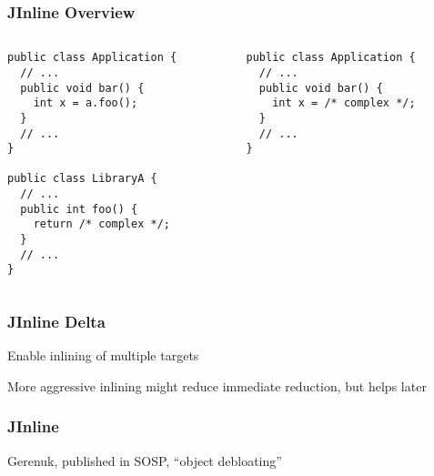 \documentclass[aspectratio=169]{beamer}
\begin{document}
  \begin{frame}[fragile]
    \frametitle{JInline Overview}
    \begin{columns}[t]
      \begin{column}{0.5\textwidth}
        \hspace{3.4em} 
        \begin{lstlisting}[xleftmargin=4em]
public class Application {
  // ...
  public void bar() {
    int x = a.foo();
  }
  // ...
}

public class LibraryA {
  // ...
  public int foo() {
    return /* complex */;
  }
  // ...
}
        \end{lstlisting}
      \end{column}
      \begin{column}{0.5\textwidth}
        \hspace{3.4em} 
        \begin{lstlisting}[xleftmargin=4em]
public class Application {
  // ...
  public void bar() {
    int x = /* complex */;
  }
  // ...
}
        \end{lstlisting}
      \end{column}
    \end{columns}
  \end{frame}

  \begin{frame}
    \frametitle{JInline Delta}
    Enable inlining of multiple targets

    More aggressive inlining might reduce immediate reduction, but helps later
  \end{frame}

  \begin{frame}
    \frametitle{JInline}
    Gerenuk, published in SOSP, ``object debloating''
  \end{frame}
\end{document}
